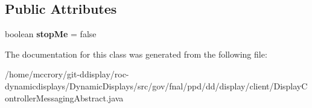\subsection*{Public Attributes}
\begin{DoxyCompactItemize}
\item 
\hypertarget{classgov_1_1fnal_1_1ppd_1_1dd_1_1display_1_1client_1_1DisplayControllerMessagingAbstract_1_1ThreadWithStop_a0b29b8779d6f9c197704bc33bbac3efb}{boolean {\bfseries stop\-Me} = false}\label{classgov_1_1fnal_1_1ppd_1_1dd_1_1display_1_1client_1_1DisplayControllerMessagingAbstract_1_1ThreadWithStop_a0b29b8779d6f9c197704bc33bbac3efb}

\end{DoxyCompactItemize}


The documentation for this class was generated from the following file\-:\begin{DoxyCompactItemize}
\item 
/home/mccrory/git-\/ddisplay/roc-\/dynamicdisplays/\-Dynamic\-Displays/src/gov/fnal/ppd/dd/display/client/Display\-Controller\-Messaging\-Abstract.\-java\end{DoxyCompactItemize}
